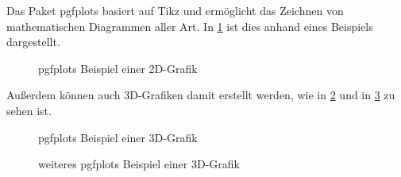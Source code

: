 \clearpage

\noindent Das Paket \glqq pgfplots\grqq{} basiert auf \glqq Tikz\grqq{} und ermöglicht das Zeichnen von mathematischen Diagrammen aller Art. In \cref{fig:pgfplotsexample2D} ist dies anhand eines Beispiels dargestellt.

\begin{figure}[!ht]
    \centering
    \caption{pgfplots Beispiel einer 2D-Grafik}
    \label{fig:pgfplotsexample2D} %
\end{figure}

\noindent Außerdem können auch 3D-Grafiken damit erstellt werden, wie in \cref{fig:pgfplotsexample3D} und in \cref{fig:anotherpgfplotsexample3D} zu sehen ist.

\begin{figure}[!ht]
    \centering
    \caption{pgfplots Beispiel einer 3D-Grafik}
    \label{fig:pgfplotsexample3D} %
\end{figure}

\clearpage

\begin{figure}[!ht]
    \centering
    \caption{weiteres pgfplots Beispiel einer 3D-Grafik}
    \label{fig:anotherpgfplotsexample3D} %
\end{figure}

